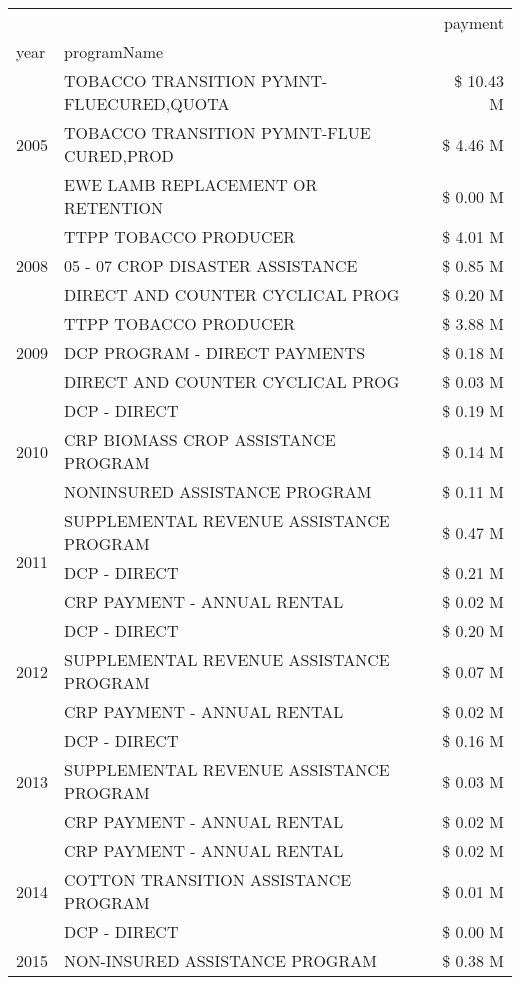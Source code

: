 \begin{tabular}{llr}
\toprule
 &  & payment \\
year & programName &  \\
\midrule
\multirow[t]{3}{*}{2005} & TOBACCO TRANSITION PYMNT-FLUECURED,QUOTA & \$ 10.43 M \\
 & TOBACCO TRANSITION PYMNT-FLUE CURED,PROD & \$ 4.46 M \\
 & EWE LAMB REPLACEMENT OR RETENTION & \$ 0.00 M \\
\cline{1-3}
\multirow[t]{3}{*}{2008} & TTPP TOBACCO PRODUCER & \$ 4.01 M \\
 & 05 - 07 CROP DISASTER ASSISTANCE & \$ 0.85 M \\
 & DIRECT AND COUNTER CYCLICAL PROG & \$ 0.20 M \\
\cline{1-3}
\multirow[t]{3}{*}{2009} & TTPP TOBACCO PRODUCER & \$ 3.88 M \\
 & DCP PROGRAM - DIRECT PAYMENTS & \$ 0.18 M \\
 & DIRECT AND COUNTER CYCLICAL PROG & \$ 0.03 M \\
\cline{1-3}
\multirow[t]{3}{*}{2010} & DCP - DIRECT & \$ 0.19 M \\
 & CRP BIOMASS CROP ASSISTANCE PROGRAM & \$ 0.14 M \\
 & NONINSURED ASSISTANCE PROGRAM & \$ 0.11 M \\
\cline{1-3}
\multirow[t]{3}{*}{2011} & SUPPLEMENTAL REVENUE ASSISTANCE PROGRAM & \$ 0.47 M \\
 & DCP - DIRECT & \$ 0.21 M \\
 & CRP PAYMENT - ANNUAL RENTAL & \$ 0.02 M \\
\cline{1-3}
\multirow[t]{3}{*}{2012} & DCP - DIRECT & \$ 0.20 M \\
 & SUPPLEMENTAL REVENUE ASSISTANCE PROGRAM & \$ 0.07 M \\
 & CRP PAYMENT - ANNUAL RENTAL & \$ 0.02 M \\
\cline{1-3}
\multirow[t]{3}{*}{2013} & DCP - DIRECT & \$ 0.16 M \\
 & SUPPLEMENTAL REVENUE ASSISTANCE PROGRAM & \$ 0.03 M \\
 & CRP PAYMENT - ANNUAL RENTAL & \$ 0.02 M \\
\cline{1-3}
\multirow[t]{3}{*}{2014} & CRP PAYMENT - ANNUAL RENTAL & \$ 0.02 M \\
 & COTTON TRANSITION ASSISTANCE PROGRAM & \$ 0.01 M \\
 & DCP - DIRECT & \$ 0.00 M \\
\cline{1-3}
\multirow[t]{3}{*}{2015} & NON-INSURED ASSISTANCE PROGRAM & \$ 0.38 M \\

\end{tabular}
